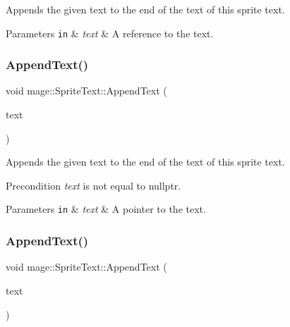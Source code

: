 Appends the given text to the end of the text of this sprite text.


\begin{DoxyParams}[1]{Parameters}
\mbox{\tt in}  & {\em text} & A reference to the text. \\
\hline
\end{DoxyParams}
\hypertarget{classmage_1_1_sprite_text_a462809b9138f94720f972505a4f74d81}{}\label{classmage_1_1_sprite_text_a462809b9138f94720f972505a4f74d81} 
\subsubsection{\texorpdfstring{Append\+Text()}{AppendText()}\hspace{0.1cm}{\footnotesize\ttfamily [2/3]}}
{\footnotesize\ttfamily void mage\+::\+Sprite\+Text\+::\+Append\+Text (\begin{DoxyParamCaption}\item[{const wchar\+\_\+t $\ast$}]{text }\end{DoxyParamCaption})}

Appends the given text to the end of the text of this sprite text.

\begin{DoxyPrecond}{Precondition}
{\itshape text} is not equal to {\ttfamily nullptr}. 
\end{DoxyPrecond}

\begin{DoxyParams}[1]{Parameters}
\mbox{\tt in}  & {\em text} & A pointer to the text. \\
\hline
\end{DoxyParams}
\hypertarget{classmage_1_1_sprite_text_a6f0bb93c634d9b05466d3998bcaf957a}{}\label{classmage_1_1_sprite_text_a6f0bb93c634d9b05466d3998bcaf957a} 
\subsubsection{\texorpdfstring{Append\+Text()}{AppendText()}\hspace{0.1cm}{\footnotesize\ttfamily [3/3]}}
{\footnotesize\ttfamily void mage\+::\+Sprite\+Text\+::\+Append\+Text (\begin{DoxyParamCaption}\item[{const \hyperlink{structmage_1_1_sprite_text_item}{Sprite\+Text\+Item} \&}]{text }\end{DoxyParamCaption})}

